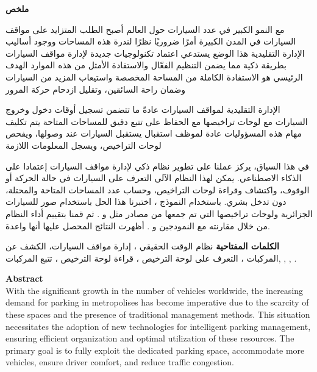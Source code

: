 \begin{RLtext}
\par
\textbf{\Large{ملخص}}\\
\small

مع النمو الكبير في عدد السيارات حول العالم أصبح الطلب المتزايد على مواقف السيارات في المدن الكبيرة أمرًا ضروريًا نظرًا لندرة هذه المساحات ووجود أساليب الإدارة التقليدية  هذا الوضع يستدعي اعتماد تكنولوجيات جديدة لإدارة مواقف السيارات بطريقة ذكية  مما يضمن التنظيم الفعّال والاستفادة الأمثل من هذه الموارد  الهدف الرئيسي هو الاستفادة الكاملة من المساحة المخصصة  واستيعاب المزيد من السيارات  وضمان راحة السائقين، وتقليل ازدحام حركة المرور 
\par
الإدارة التقليدية لمواقف السيارات عادةً ما تتضمن تسجيل أوقات دخول وخروج السيارات مع لوحات تراخيصها مع الحفاظ على تتبع دقيق للمساحات المتاحة  يتم تكليف مهام هذه المسؤوليات عادة لموظف استقبال يستقبل 
السيارات عند وصولها، ويفحص لوحات التراخيص، ويسجل المعلومات اللازمة 


\par
في هذا السياق، يركز عملنا على تطوير نظام ذكي لإدارة مواقف السيارات إعتمادا على الذكاء الاصطناعي. يمكن لهذا النظام الآلي التعرف على السيارات في حالة الحركة أو الوقوف، واكتشاف وقراءة لوحات التراخيص، وحساب عدد  المساحات المتاحة والمحتلة، دون تدخل بشري. باستخدام النموذج ، اختبرنا هذا الحل باستخدام صور للسيارات الجزائرية ولوحات تراخيصها التي تم جمعها من مصادر مثل   و .  ثم قمنا بتقييم أداء النظام من خلال مقارنته مع  النمودجين  و . أظهرت النتائج المحصل عليها أنها واعدة.


\textbf{الكلمات المفتاحية \LR{:}} 
 نظام الوقت الحقيقي ، إدارة مواقف السيارات، الكشف عن المركبات ، التعرف على لوحة الترخيص ، قراءة لوحة الترخيص ،  تتبع المركبات,  ,  ,  .
\end{RLtext}

\vspace{0.5cm}

\par
\textbf{\Large{Abstract}}\\

With the significant growth in the number of vehicles worldwide, the increasing demand for parking in metropolises has become imperative due to the scarcity of these spaces and the presence of traditional management methods. This situation necessitates the adoption of new technologies for intelligent parking management, ensuring efficient organization and optimal utilization of these resources. The primary goal is to fully exploit the dedicated parking space, accommodate more vehicles, ensure driver comfort, and reduce traffic congestion.

